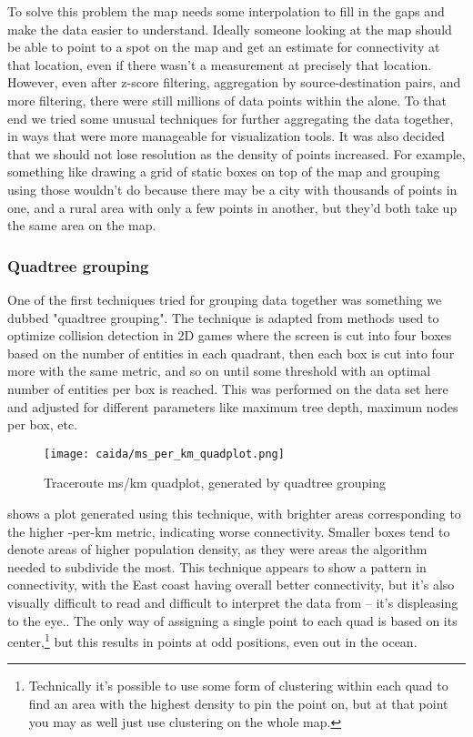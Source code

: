 To solve this problem the map needs some interpolation to fill in the gaps and make the data easier to understand. Ideally someone looking at the map should be able to point to a spot on the map and get an estimate for connectivity at that location, even if there wasn't a measurement at precisely that location. However, even after z-score filtering, aggregation by source-destination pairs, and more filtering, there were still millions of data points within the \us alone. To that end we tried some unusual techniques for further aggregating the data together, in ways that were more manageable for visualization tools. It was also decided that we should not lose resolution as the density of points increased. For example, something like drawing a grid of static boxes on top of the map and grouping using those wouldn't do because there may be a city with thousands of points in one, and a rural area with only a few points in another, but they'd both take up the same area on the map.

\subsubsection{Quadtree grouping} One of the first techniques tried for grouping data together was something we dubbed "quadtree grouping". The technique is adapted from methods used to optimize collision detection in 2D games where the screen is cut into four boxes based on the number of entities in each quadrant, then each box is cut into four more with the same metric, and so on until some threshold with an optimal number of entities per box is reached. This was performed on the data set here and adjusted for different parameters like maximum tree depth, maximum nodes per box, etc.

\begin{figure}[h]
    \centering
    \texttt{[image: caida/ms\_per\_km\_quadplot.png]}
    \caption{Traceroute ms/km quadplot, generated by quadtree grouping}
    \label{fig:quadtree_grouping}
\end{figure}

 shows a plot generated using this technique, with brighter areas corresponding to the higher \rtt-per-km metric, indicating worse connectivity. Smaller boxes tend to denote areas of higher population density, as they were areas the algorithm needed to subdivide the most. This technique appears to show a pattern in connectivity, with the East coast having overall better connectivity, but it's also visually difficult to read and difficult to interpret the data from -- it's displeasing to the eye.. The only way of assigning a single point to each quad is based on its center,\footnote{Technically it's possible to use some form of clustering within each quad to find an area with the highest density to pin the point on, but at that point you may as well just use clustering on the whole map.} but this results in points at odd positions, even out in the ocean.

